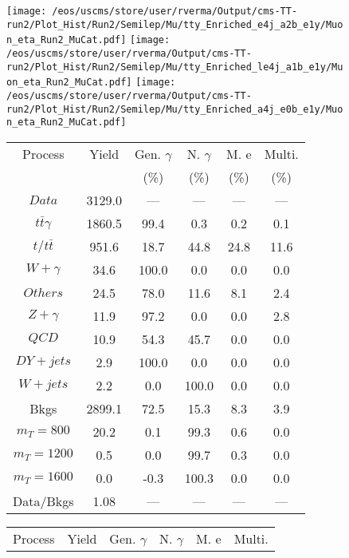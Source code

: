 \begin{figure}
\centering
\texttt{[image: /eos/uscms/store/user/rverma/Output/cms-TT-run2/Plot\_Hist/Run2/Semilep/Mu/tty\_Enriched\_e4j\_a2b\_e1y/Muon\_eta\_Run2\_MuCat.pdf]}
\texttt{[image: /eos/uscms/store/user/rverma/Output/cms-TT-run2/Plot\_Hist/Run2/Semilep/Mu/tty\_Enriched\_le4j\_a1b\_e1y/Muon\_eta\_Run2\_MuCat.pdf]}
\texttt{[image: /eos/uscms/store/user/rverma/Output/cms-TT-run2/Plot\_Hist/Run2/Semilep/Mu/tty\_Enriched\_a4j\_e0b\_e1y/Muon\_eta\_Run2\_MuCat.pdf]}
\begin{minipage}[c]{0.32\textwidth}
\centering
\tiny{
\begin{tabular}{cccccc}
\hline
Process & Yield & Gen. $\gamma$ & N. $\gamma$ & M. e & Multi. \\
 &  & (\%) & (\%) & (\%) & (\%)  \\
\hline
                                                                      $ Data $ &  3129.0 &  --- &  --- &  --- &  ---\\
$ t\bar{t}\gamma $ &  1860.5 &  99.4 &  0.3 &  0.2 &  0.1\\
$ t/t\bar{t} $ &  951.6 &  18.7 &  44.8 &  24.8 &  11.6\\
$ W+\gamma $ &  34.6 &  100.0 &  0.0 &  0.0 &  0.0\\
$ Others $ &  24.5 &  78.0 &  11.6 &  8.1 &  2.4\\
$ Z+\gamma $ &  11.9 &  97.2 &  0.0 &  0.0 &  2.8\\
$ QCD $ &  10.9 &  54.3 &  45.7 &  0.0 &  0.0\\
$ DY+jets $ &  2.9 &  100.0 &  0.0 &  0.0 &  0.0\\
$ W+jets $ &  2.2 &  0.0 &  100.0 &  0.0 &  0.0\\
Bkgs &  2899.1 &  72.5 &  15.3 &  8.3 &  3.9\\
$ m_{T} = 800 $ &  20.2 &  0.1 &  99.3 &  0.6 &  0.0\\
$ m_{T} = 1200 $ &  0.5 &  0.0 &  99.7 &  0.3 &  0.0\\
$ m_{T} = 1600 $ &  0.0 &  -0.3 &  100.3 &  0.0 &  0.0\\
Data/Bkgs &  1.08 &  --- &  --- &  --- &  ---\\
\hline
\end{tabular}
}
\end{minipage}
\begin{minipage}[c]{0.32\textwidth}
\centering
\tiny{
\begin{tabular}{cccccc}
\hline
Process & Yield & Gen. $\gamma$ & N. $\gamma$ & M. e & Multi. \\

\end{tabular}}
\end{minipage}
\end{figure}
